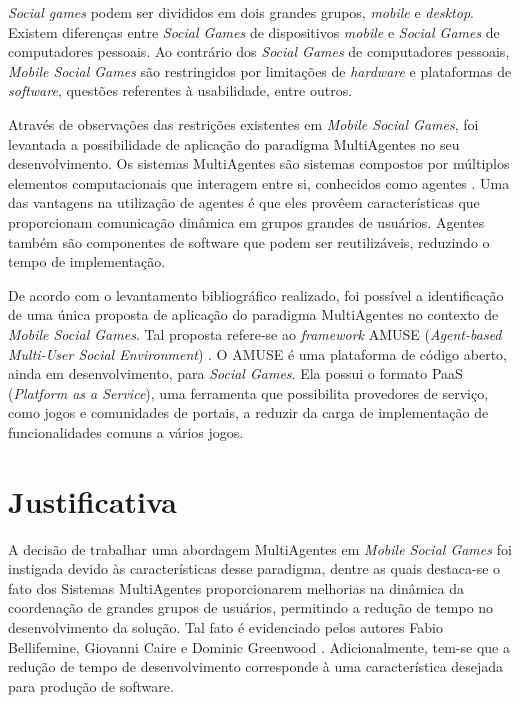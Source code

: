 \textit{Social games} podem ser divididos em dois grandes grupos, \textit{mobile} e \textit{desktop}. Existem diferen\c{c}as entre \textit{Social Games} de dispositivos \textit{mobile} e \textit{Social Games} de computadores pessoais.
Ao contrário dos \textit{Social Games} de computadores pessoais, \textit{Mobile Social Games} são restringidos por limita\c{c}\~oes de \textit{hardware} e plataformas de \textit{software}, questões
referentes à usabilidade, entre outros\cite{yamakani2011}.

Através de observações das restrições existentes em \textit{Mobile Social Games}, foi levantada a possibilidade de aplicação do paradigma MultiAgentes
no seu desenvolvimento. Os sistemas MultiAgentes são sistemas
compostos por múltiplos elementos computacionais que interagem entre si, conhecidos como agentes \cite{wooldridge2009}.
Uma das vantagens na utilização de agentes é que eles provêem características que proporcionam comunicação dinâmica em
grupos grandes de usuários\cite{bergenti2015}. Agentes também são componentes de software que podem ser reutilizáveis, reduzindo o tempo de
implementação\cite{bergentiHuhns2014}.

De acordo com o levantamento bibliográfico realizado, foi possível a identificação de uma única proposta de aplicação do paradigma MultiAgentes no contexto de \textit{Mobile Social Games}. Tal proposta refere-se ao \textit{framework} AMUSE (\textit{Agent-based Multi-User Social Environment})
\cite{amuse}. O AMUSE é uma plataforma de código aberto, ainda em desenvolvimento, para \textit{Social Games}.
Ela possui o formato PaaS (\textit{Platform as a Service})\cite{bergenti2015}, uma ferramenta que possibilita provedores de serviço,
como jogos e comunidades de portais, a reduzir da carga de implementação de funcionalidades
comuns a vários jogos\cite{bergenti2015}.

\section{Justificativa}

A decisão de trabalhar uma abordagem MultiAgentes em \textit{Mobile Social Games} foi instigada devido às características desse paradigma,
dentre as quais destaca-se o fato dos Sistemas MultiAgentes proporcionarem melhorias na dinâmica da coordenação de grandes grupos
de usuários, permitindo a redução de tempo no desenvolvimento da solução. Tal fato é evidenciado pelos autores Fabio Bellifemine, Giovanni Caire e Dominic Greenwood
\cite{fabio2007}. Adicionalmente, tem-se que a redução de tempo de desenvolvimento corresponde à uma característica desejada
para produção de software\cite{bergenti2015}.


